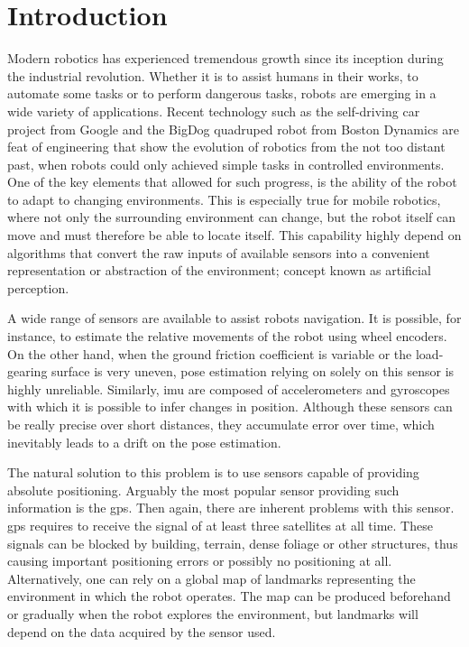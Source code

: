 \chapter*{Introduction} 

Modern robotics has experienced tremendous growth since its inception during the industrial revolution. Whether it is to assist humans in their works, to automate some tasks or to perform dangerous tasks, robots are emerging in a wide variety of applications. Recent technology such as the self-driving car project from Google and the BigDog quadruped robot from Boston Dynamics are feat of engineering that show the evolution of robotics from the not too distant past, when robots could only achieved simple tasks in controlled environments. One of the key elements that allowed for such progress, is the ability of the robot to adapt to changing environments. This is especially true for mobile robotics, where not only the surrounding environment can change, but the robot itself can move and must therefore be able to locate itself. This capability highly depend on algorithms that convert the raw inputs of available sensors into a convenient representation or abstraction of the environment; concept known as artificial perception.

A wide range of sensors are available to assist robots navigation. It is possible, for instance, to estimate the relative movements of the robot using wheel encoders. On the other hand, when the ground friction coefficient is variable or the load-gearing surface is very uneven, pose estimation relying on solely on this sensor is highly unreliable. Similarly, \gls*{imu} are composed of accelerometers and gyroscopes with which it is possible to infer changes in position. Although these sensors can be really precise over short distances, they accumulate error over time, which inevitably leads to a drift on the pose estimation.

The natural solution to this problem is to use sensors capable of providing absolute positioning. Arguably the most popular sensor providing such information is the \gls*{gps}. Then again, there are inherent problems with this sensor. \gls*{gps} requires to receive the signal of at least three satellites at all time. These signals can be blocked by building, terrain, dense foliage or other structures, thus causing important positioning errors or possibly no positioning at all. Alternatively, one can rely on a global map of landmarks representing the environment in which the robot operates. The map can be produced beforehand or gradually when the robot explores the environment, but landmarks will depend on the data acquired by the sensor used. 

